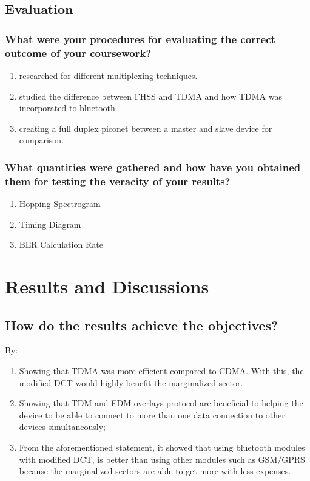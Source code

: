\subsection{Evaluation}
\label{sec:eval}

\subsubsection{What were your procedures for evaluating the correct outcome of your coursework?}
\begin{enumerate}
	\item researched for different multiplexing techniques.
	\item studied the difference between FHSS and TDMA and how TDMA was incorporated to bluetooth.
	\item creating a full duplex piconet between a master and slave device for comparison.
\end{enumerate}

\subsubsection{What quantities were gathered and how have you obtained them for testing the veracity of your results?}
\begin{enumerate}
	\item Hopping Spectrogram
	\item Timing Diagram
	\item BER Calculation Rate
\end{enumerate}


\section{Results and Discussions}

\subsection{How do the results achieve the objectives?}
By:
\begin{enumerate}
	\item Showing that TDMA was more efficient compared to CDMA. With this, the modified DCT would highly benefit the marginalized sector.
	\item Showing that TDM and FDM overlays protocol are beneficial to helping the device to be able to connect to more than one data connection to other devices simultaneously;
	\item From the aforementioned statement, it showed that using bluetooth modules with modified DCT, is better than using other modules such as GSM/GPRS because the marginalized sectors are able to get more with less expenses.
	
\end{enumerate}

